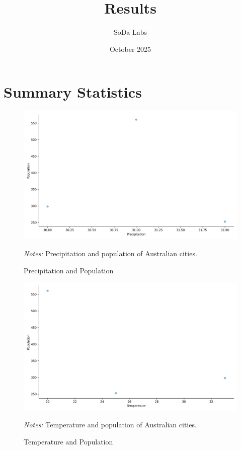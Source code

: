 \documentclass[12pt,a4paper]{article}
\title{Results}
\author{SoDa Labs}
\date{October 2025}
\newcommand\fnote[1]{\captionsetup{font=footnotesize}\caption*{#1}}
\begin{document}
\maketitle

\section{Summary Statistics}


\begin{figure}
  \centering
  \caption{Precipitation and Population}
  \label{fig:precipitation_population}
  \includegraphics[width=\textwidth]{figures/precipitation_population.png}
\fnote{\scriptsize \textit{Notes:} Precipitation and population of Australian cities.}
\end{figure}

\begin{figure}
  \centering
  \caption{Temperature and Population}
  \label{fig:temperature_population}
  \includegraphics[width=\textwidth]{figures/temperature_population.png}
\fnote{\scriptsize \textit{Notes:} Temperature and population of Australian cities.}
\end{figure}
\end{document}
